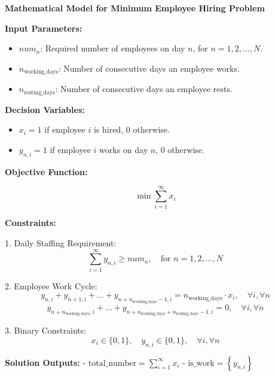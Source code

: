 \documentclass{article}
\begin{document}
\textbf{Mathematical Model for Minimum Employee Hiring Problem}

\textbf{Input Parameters:}
\begin{itemize}
    \item \(num_n\): Required number of employees on day \(n\), for \(n = 1, 2, \ldots, N\).
    \item \(n_{\text{working\_days}}\): Number of consecutive days an employee works.
    \item \(n_{\text{resting\_days}}\): Number of consecutive days an employee rests.
\end{itemize}

\textbf{Decision Variables:}
\begin{itemize}
    \item \(x_i = 1\) if employee \(i\) is hired, 0 otherwise.
    \item \(y_{n,i} = 1\) if employee \(i\) works on day \(n\), 0 otherwise.
\end{itemize}

\textbf{Objective Function:}

\[
\min \sum_{i=1}^{\infty} x_i
\]

\textbf{Constraints:}

1. Daily Staffing Requirement:
    \[
    \sum_{i=1}^{\infty} y_{n,i} \geq num_n, \quad \text{for } n = 1, 2, \ldots, N
    \]

2. Employee Work Cycle:
    \[
    y_{n,i} + y_{n+1,i} + \ldots + y_{n+n_{\text{working\_days}}-1,i} = n_{\text{working\_days}} \cdot x_i, \quad \forall i, \forall n
    \]
    \[
    y_{n+n_{\text{working\_days}},i} + \ldots + y_{n+n_{\text{working\_days}}+n_{\text{resting\_days}}-1,i} = 0, \quad \forall i, \forall n
    \]

3. Binary Constraints:
    \[
    x_i \in \{0, 1\} , \quad y_{n,i} \in \{0, 1\}, \quad \forall i, \forall n
    \]

\textbf{Solution Outputs:}
- \(\text{total\_number} = \sum_{i=1}^{\infty} x_i\)
- \(\text{is\_work} = \left\{y_{n,i}\right\}\)
\end{document}

